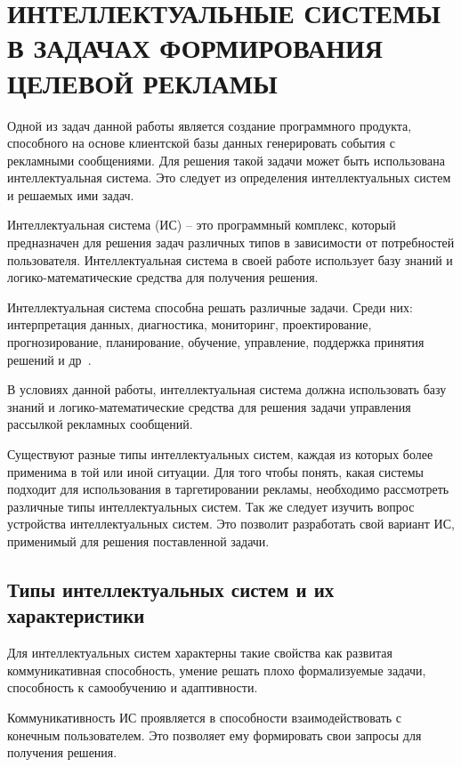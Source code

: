 \chapter{ИНТЕЛЛЕКТУАЛЬНЫЕ СИСТЕМЫ В ЗАДАЧАХ ФОРМИРОВАНИЯ ЦЕЛЕВОЙ РЕКЛАМЫ}

Одной из задач данной работы является создание программного продукта, способного на основе клиентской базы данных генерировать события с рекламными сообщениями. Для решения такой задачи может быть использована  интеллектуальная система. Это следует из определения интеллектуальных систем и решаемых ими задач.

Интеллектуальная система (ИС) – это программный комплекс, который предназначен для решения задач различных типов в зависимости от потребностей пользователя. Интеллектуальная система в своей работе использует базу знаний и логико-математические средства для получения решения.

Интеллектуальная система способна решать различные задачи. Среди них: интерпретация данных, диагностика, мониторинг, проектирование, прогнозирование, планирование, обучение, управление, поддержка принятия решений и др~\cite{is1}.

В условиях данной работы, интеллектуальная система должна использовать базу знаний и логико-математические средства для решения задачи управления рассылкой рекламных сообщений.

Существуют разные типы интеллектуальных систем, каждая из которых более применима в той или иной ситуации. Для того чтобы понять, какая системы подходит для использования в таргетировании рекламы, необходимо рассмотреть различные типы интеллектуальных систем. Так же следует изучить вопрос устройства интеллектуальных систем. Это позволит разработать свой вариант ИС, применимый для решения поставленной задачи.

\section{Типы интеллектуальных систем и их характеристики}

Для интеллектуальных систем характерны такие свойства как развитая коммуникативная способность, умение решать плохо формализуемые задачи, способность к самообучению и адаптивности.

Коммуникативность ИС проявляется в способности взаимодействовать с конечным пользователем. Это позволяет ему формировать свои запросы для получения решения.

